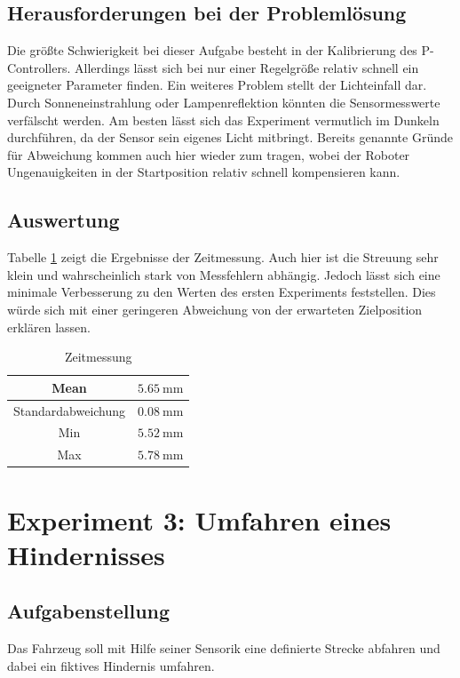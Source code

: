 \documentclass[ngerman]{tudscrreprt}
\begin{document}
\subsection{Herausforderungen bei der Problemlösung}
Die größte Schwierigkeit bei dieser Aufgabe besteht in der Kalibrierung des P-Controllers. Allerdings lässt sich bei nur einer Regelgröße relativ schnell ein geeigneter Parameter finden. Ein weiteres Problem stellt der Lichteinfall dar. Durch Sonneneinstrahlung oder Lampenreflektion könnten die Sensormesswerte verfälscht werden. Am besten lässt sich das Experiment vermutlich im Dunkeln durchführen, da der Sensor sein eigenes Licht mitbringt. Bereits genannte Gründe für Abweichung kommen auch hier wieder zum tragen, wobei der Roboter Ungenauigkeiten in der Startposition relativ schnell kompensieren kann.

\subsection{Auswertung}
Tabelle \ref{table:zeitmessung2} zeigt die Ergebnisse der Zeitmessung. Auch hier ist die Streuung sehr klein und wahrscheinlich stark von Messfehlern abhängig. Jedoch lässt sich eine minimale Verbesserung zu den Werten des ersten Experiments feststellen. Dies würde sich mit einer geringeren Abweichung von der erwarteten Zielposition erklären lassen.
%
\begin{table}[H]
    \centering
    \begin{tabular}{|c|c|}
    \hline
    Mean               & $\SI{5,65}{\mm}$ \\ \hline
    Standardabweichung & $\SI{0,08}{\mm}$ \\ \hline
    Min                & $\SI{5,52}{\mm}$ \\ \hline
    Max                & $\SI{5,78}{\mm}$ \\ \hline
    \end{tabular}
    \caption{Zeitmessung}
    \label{table:zeitmessung2}
\end{table}

\section{Experiment 3: Umfahren eines Hindernisses}
\subsection{Aufgabenstellung}
Das Fahrzeug soll mit Hilfe seiner Sensorik eine definierte Strecke abfahren und dabei ein fiktives Hindernis umfahren.
\end{document}
